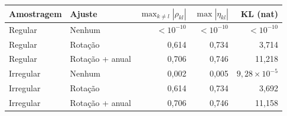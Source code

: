 \begin{tabular}{llrrr}
\toprule
Amostragem & Ajuste & $\max_{k\ne l}|\rho_{kl}|$ & $\max|\eta_{kl}|$ & KL (nat)\\
\midrule
Regular & Nenhum & $<10^{-10}$ & $<10^{-10}$ & $<10^{-10}$\\
Regular & Rotação & 0,614 & 0,734 & 3,714\\
Regular & Rotação + anual & 0,706 & 0,746 & 11,218\\
Irregular & Nenhum & 0,002 & 0,005 & $9,28\times10^{-5}$\\
Irregular & Rotação & 0,614 & 0,734 & 3,692\\
Irregular & Rotação + anual & 0,706 & 0,746 & 11,158\\
\bottomrule
\end{tabular}
